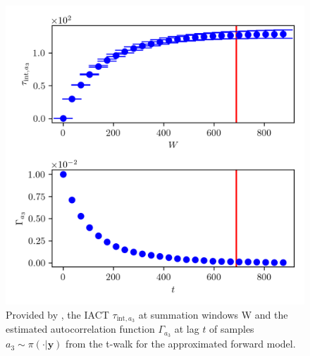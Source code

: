 \begin{figure}[ht!]
	\centering
	\includegraphics{UwerrTauIntTWalk11.png}
	\caption[IACT and autocorrelation function of samples $a_3 \sim \pi(\cdot|\bm{y})$, for approximated model.]{Provided by \cite{drikHesse}, the IACT $\tau_{\text{int},a_3}$ at summation windows W and the estimated autocorrelation function $\Gamma_{a_3}$ at lag $t$ of samples $a_3 \sim \pi( \cdot| \bm{y})$ from the t-walk for the approximated forward model.}
	\label{fig:TWalkIATC12}
\end{figure}

